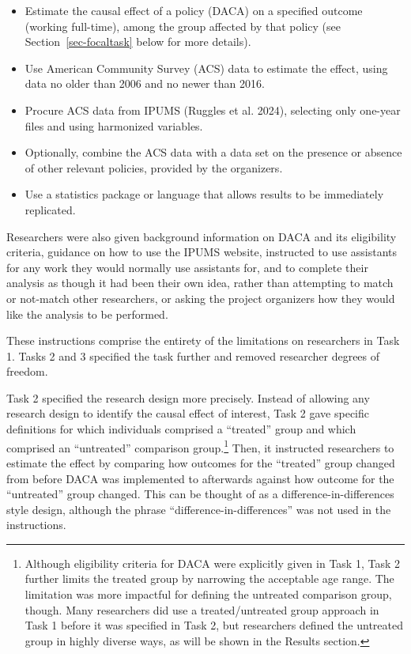 \documentclass[
  letterpaper,
  DIV=11,
  numbers=noendperiod]{scrartcl}
\begin{document}
\begin{itemize}
\item
  Estimate the causal effect of a policy (DACA) on a specified outcome
  (working full-time), among the group affected by that policy (see
  Section~\ref{sec-focaltask} below for more details).
\item
  Use American Community Survey (ACS) data to estimate the effect, using
  data no older than 2006 and no newer than 2016.
\item
  Procure ACS data from IPUMS (Ruggles et al. 2024), selecting only
  one-year files and using harmonized variables.
\item
  Optionally, combine the ACS data with a data set on the presence or
  absence of other relevant policies, provided by the organizers.
\item
  Use a statistics package or language that allows results to be
  immediately replicated.
\end{itemize}

Researchers were also given background information on DACA and its
eligibility criteria, guidance on how to use the IPUMS website,
instructed to use assistants for any work they would normally use
assistants for, and to complete their analysis as though it had been
their own idea, rather than attempting to match or not-match other
researchers, or asking the project organizers how they would like the
analysis to be performed.

These instructions comprise the entirety of the limitations on
researchers in Task 1. Tasks 2 and 3 specified the task further and
removed researcher degrees of freedom.

Task 2 specified the research design more precisely. Instead of allowing
any research design to identify the causal effect of interest, Task 2
gave specific definitions for which individuals comprised a ``treated''
group and which comprised an ``untreated'' comparison group.\footnote{Although
  eligibility criteria for DACA were explicitly given in Task 1, Task 2
  further limits the treated group by narrowing the acceptable age
  range. The limitation was more impactful for defining the untreated
  comparison group, though. Many researchers did use a treated/untreated
  group approach in Task 1 before it was specified in Task 2, but
  researchers defined the untreated group in highly diverse ways, as
  will be shown in the Results section.} Then, it instructed researchers
to estimate the effect by comparing how outcomes for the ``treated''
group changed from before DACA was implemented to afterwards against how
outcome for the ``untreated'' group changed. This can be thought of as a
difference-in-differences style design, although the phrase
``difference-in-differences'' was not used in the instructions.
\end{document}
